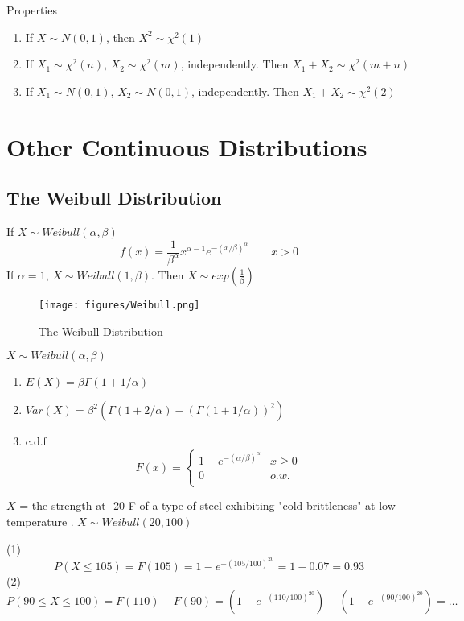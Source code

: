 \begin{prop}
Properties
\begin{enumerate}
\item If $X \sim N(0,1)$, then $X^2 \sim \chi^2 (1)$
\item If $X_1 \sim \chi^2 (n)$, $X_2 \sim \chi^2 (m)$, independently. Then $X_1+X_2 \sim \chi^2 (m+n)$ 
\item If $X_1 \sim N(0,1)$, $X_2 \sim N(0,1)$, independently. Then $X_1+X_2 \sim \chi^2 (2)$ 
\end{enumerate}
\end{prop}

\section{Other Continuous Distributions}
\subsection{The Weibull Distribution}
If $X \sim Weibull(\alpha,\beta)$
\[f(x)=\frac{1}{\beta^{\alpha}}x^{\alpha-1}e^{-(x/\beta)^{\alpha}} \qquad x >0\]
If $\alpha=1$, $X \sim Weibull(1,\beta)$. Then $X \sim exp(\frac{1}{\beta}) $

\begin{figure}[H]
\centering
\texttt{[image: figures/Weibull.png]}
\caption{The Weibull Distribution}
\end{figure}

\begin{prop}
 $X \sim Weibull(\alpha,\beta)$
\begin{enumerate}
\item $E(X)=\beta \Gamma(1+1/\alpha)$
\item $Var(X)=\beta^2\left(\Gamma(1+2/\alpha)-(\Gamma(1+1/\alpha))^2\right)$
\item c.d.f
\[F(x)=\begin{cases}
1-e^{-(\alpha/\beta)^{\alpha}} & x \geq 0 \\
0	&o.w. \\
\end{cases}\]
\end{enumerate}
\end{prop}

\begin{exmp}
$X$ = the strength at  -20 F of a type of steel exhibiting "cold brittleness" at low temperature . $X \sim Weibull(20,100)$

(1) 
\[P(X \leq 105)=F(105)=1-e^{-(105/100)^{20}}=1-0.07=\boxed{0.93}\]
(2)
\[P(90 \leq X \leq 100)=F(110)-F(90)=\left(1-e^{-(110/100)^{20}}\right)-\left(1-e^{-(90/100)^{20}}\right)=\boxed{\dots}\] 
\end{exmp}

